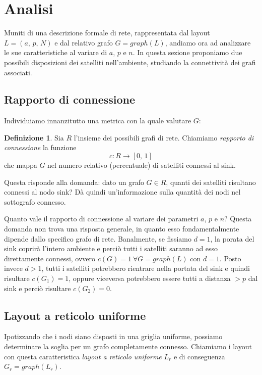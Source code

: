 \documentclass[a4paper,12pt]{article}
\theoremstyle{definition}
\newtheorem{definition}{Definizione}
\begin{document}

\section{Analisi}

Muniti di una descrizione formale di rete, rappresentata dal layout $L = (a,\,p,\,N)$ e dal relativo grafo $G = graph(L)$, andiamo ora ad analizzare le sue caratteristiche al variare di $a$, $p$ e $n$. In questa sezione proponiamo due possibili disposizioni dei satelliti nell'ambiente, studiando la connettività dei grafi associati.

\subsection{Rapporto di connessione}

Individuiamo innanzitutto una metrica con la quale valutare $G$:

\begin{definition}
Sia $R$ l'insieme dei possibili grafi di rete. Chiamiamo \emph{rapporto di connessione} la funzione
\begin{equation*}
c \colon R \to [0,\,1]
\end{equation*}
che mappa $G$ nel numero relativo (percentuale) di satelliti connessi al sink.
\end{definition}

Questa risponde alla domanda: dato un grafo $G \in R$, quanti dei satelliti risultano connessi al nodo sink? Dà quindi un'informazione sulla quantità dei nodi nel sottografo connesso.

Quanto vale il rapporto di connessione al variare dei parametri $a$, $p$ e $n$? Questa domanda non trova una risposta generale, in quanto esso fondamentalmente dipende dallo specifico grafo di rete. Banalmente, se fissiamo $d = 1$, la porata del sink coprirà l'intero ambiente e perciò tutti i satelliti saranno ad esso direttamente connessi, ovvero $c(G) = 1 \ \forall G = graph(L)$ con $d = 1$. Posto invece $d > 1$, tutti i satelliti potrebbero rientrare nella portata del sink e quindi risultare $c(G_1) = 1$, oppure viceversa potrebbero essere tutti a distanza $> p$ dal sink e perciò risultare $c(G_2) = 0$.

\subsection{Layout a reticolo uniforme}

Ipotizzando che i nodi siano disposti in una griglia uniforme, possiamo determinare la soglia per un grafo completamente connesso. Chiamiamo i layout con questa caratteristica \emph{layout a reticolo uniforme} $L_r$ e di conseguenza $G_r = graph(L_r)$.
\end{document}

